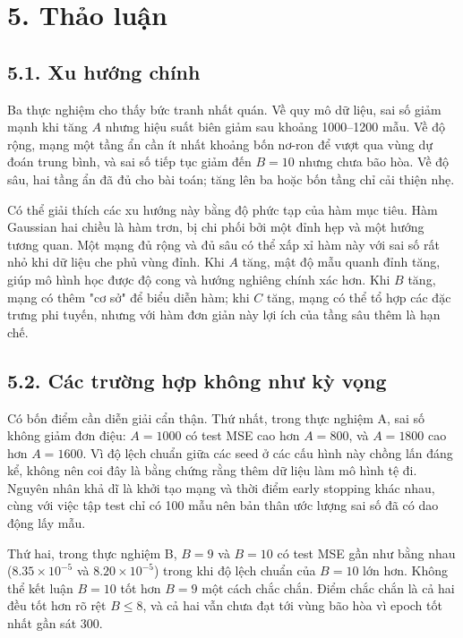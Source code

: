 \documentclass[12pt,a4paper]{article}
\begin{document}
\section{5. Thảo luận}

\subsection{5.1. Xu hướng chính}

Ba thực nghiệm cho thấy bức tranh nhất quán. Về quy mô dữ liệu, sai số giảm mạnh khi tăng $A$ nhưng hiệu suất biên giảm sau khoảng 1000--1200 mẫu. Về độ rộng, mạng một tầng ẩn cần ít nhất khoảng bốn nơ-ron để vượt qua vùng dự đoán trung bình, và sai số tiếp tục giảm đến $B=10$ nhưng chưa bão hòa. Về độ sâu, hai tầng ẩn đã đủ cho bài toán; tăng lên ba hoặc bốn tầng chỉ cải thiện nhẹ.

Có thể giải thích các xu hướng này bằng độ phức tạp của hàm mục tiêu. Hàm Gaussian hai chiều là hàm trơn, bị chi phối bởi một đỉnh hẹp và một hướng tương quan. Một mạng đủ rộng và đủ sâu có thể xấp xỉ hàm này với sai số rất nhỏ khi dữ liệu che phủ vùng đỉnh. Khi $A$ tăng, mật độ mẫu quanh đỉnh tăng, giúp mô hình học được độ cong và hướng nghiêng chính xác hơn. Khi $B$ tăng, mạng có thêm "cơ sở" để biểu diễn hàm; khi $C$ tăng, mạng có thể tổ hợp các đặc trưng phi tuyến, nhưng với hàm đơn giản này lợi ích của tầng sâu thêm là hạn chế.

\subsection{5.2. Các trường hợp không như kỳ vọng}

Có bốn điểm cần diễn giải cẩn thận. Thứ nhất, trong thực nghiệm A, sai số không giảm đơn điệu: $A=1000$ có test MSE cao hơn $A=800$, và $A=1800$ cao hơn $A=1600$. Vì độ lệch chuẩn giữa các seed ở các cấu hình này chồng lấn đáng kể, không nên coi đây là bằng chứng rằng thêm dữ liệu làm mô hình tệ đi. Nguyên nhân khả dĩ là khởi tạo mạng và thời điểm early stopping khác nhau, cùng với việc tập test chỉ có 100 mẫu nên bản thân ước lượng sai số đã có dao động lấy mẫu.

Thứ hai, trong thực nghiệm B, $B=9$ và $B=10$ có test MSE gần như bằng nhau ($8.35\times10^{-5}$ và $8.20\times10^{-5}$) trong khi độ lệch chuẩn của $B=10$ lớn hơn. Không thể kết luận $B=10$ tốt hơn $B=9$ một cách chắc chắn. Điểm chắc chắn là cả hai đều tốt hơn rõ rệt $B \le 8$, và cả hai vẫn chưa đạt tới vùng bão hòa vì epoch tốt nhất gần sát 300.
\end{document}
